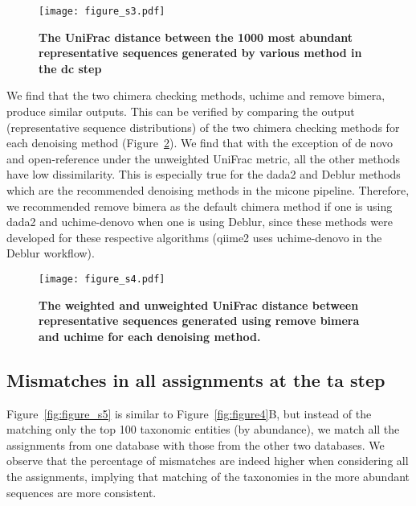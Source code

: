     \begin{figure}[H]
      \centering
      \texttt{[image: figure\_s3.pdf]}
    \end{figure}
    \begin{figure}[H]
      \centering
        \caption{
          \textbf{The UniFrac distance between the 1000 most abundant representative sequences generated by various method in the \ac{dc} step}
        }
      \label{fig:figure_s3}
    \end{figure}
    \FloatBarrier
    \newpage

    We find that the two chimera checking methods, uchime and remove bimera, produce similar outputs.
    This can be verified by comparing the output (representative sequence distributions) of the two chimera checking methods for each denoising method (Figure~\ref{fig:figure_s4}).
    We find that with the exception of de novo and open-reference under the unweighted UniFrac metric, all the other methods have low dissimilarity.
    This is especially true for the \ac{dada2} and Deblur methods which are the recommended denoising methods in the \ac{micone} pipeline.
    Therefore, we recommended remove bimera as the default chimera method if one is using \ac{dada2} and uchime-denovo when one is using Deblur, since these methods were developed for these respective algorithms (\ac{qiime2} uses uchime-denovo in the Deblur workflow).

    \begin{figure}[H]
      \centering
      \texttt{[image: figure\_s4.pdf]}
    \end{figure}
    \begin{figure}[H]
      \centering
        \caption{
          \textbf{The weighted and unweighted UniFrac distance between representative sequences generated using remove bimera and uchime for each denoising method.}
        }
      \label{fig:figure_s4}
    \end{figure}
    \FloatBarrier
    \newpage

  \subsection*{Mismatches in all assignments at the \ac{ta} step}

    Figure~\ref{fig:figure_s5} is similar to Figure~\ref{fig:figure4}B, but instead of the matching only the top 100 taxonomic entities (by abundance), we match all the assignments from one database with those from the other two databases.
    We observe that the percentage of mismatches are indeed higher when considering all the assignments, implying that matching of the taxonomies in the more abundant sequences are more consistent.

